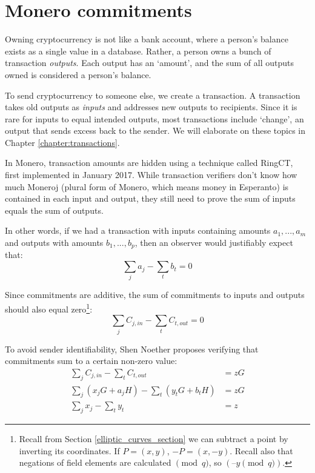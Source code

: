 \section{Monero commitments}
\label{sec:pedersen_monero}

Owning cryptocurrency is not like a bank account, where a person’s balance exists as a single value in a database. Rather, a person owns a bunch of transaction {\em outputs}. Each output has an `amount’, and the sum of all outputs owned is considered a person’s balance.

To send cryptocurrency to someone else, we create a transaction. A transaction takes old outputs as {\em inputs} and addresses new outputs to recipients. Since it is rare for inputs to equal intended outputs, most transactions include `change’, an output that sends excess back to the sender. We will elaborate on these topics in Chapter \ref{chapter:transactions}.

In Monero, transaction amounts are hidden using a technique called RingCT, first implemented in January 2017. While transaction verifiers don’t know how much Moneroj (plural form of Monero, which means money in Esperanto) is contained in each input and output, they still need to prove the sum of inputs equals the sum of outputs. 

In other words, if we had a transaction with inputs containing amounts \(a_1, ..., a_m\) and outputs with amounts \(b_1, ..., b_p\), then an observer would justifiably expect that: \\
\[\sum_j a_j - \sum_t b_t = 0\]

Since commitments are additive, the sum of commitments to inputs and outputs should also equal zero\footnote{Recall from Section \ref{elliptic_curves_section} we can subtract a point by inverting its coordinates. If $P = (x, y)$, $-P = (x, -y)$. Recall also that negations of field elements are calculated $\pmod q$, so $(–y \pmod q)$.}:
\[\sum_{j}{C_{j, in}}     - \sum_{t}{C_{t, out}} = 0\]

To avoid sender identifiability, Shen Noether proposes \cite{cryptoeprint:2015:1098} verifying that commitments sum to a certain non-zero value:\\
\begin{align*}
\sum_{j}{C_{j, in}}     - \sum_{t}{C_{t, out}} &= z G \\
\sum_{j}{(x_j G + a_j H)}  - \sum_{t}{(y_t G + b_t H)} &= z G \\
\sum_{j} x_j - \sum_{t} y_t &= z
\end{align*}


